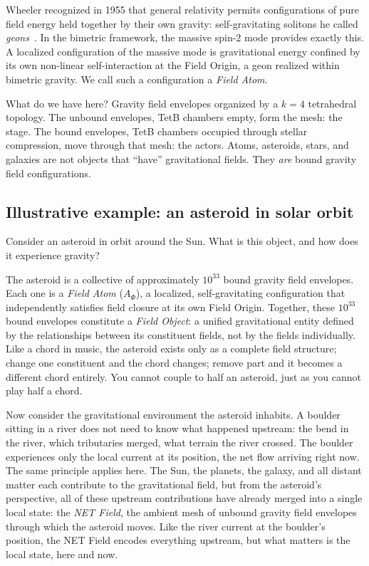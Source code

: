 \documentclass[aps,prd,preprint,superscriptaddress,showpacs,preprintnumbers,amsmath,amssymb,nofootinbib]{revtex4-2}
\begin{document}
Wheeler recognized in 1955 that general relativity permits configurations of pure field energy held together by their own gravity: self-gravitating solitons he called \emph{geons}~\cite{wheeler1955}. In the bimetric framework, the massive spin-2 mode provides exactly this. A localized configuration of the massive mode is gravitational energy confined by its own non-linear self-interaction at the Field Origin, a geon realized within bimetric gravity. We call such a configuration a \emph{Field Atom}.

What do we have here? Gravity field envelopes organized by a $k = 4$ tetrahedral topology. The unbound envelopes, TetB chambers empty, form the mesh: the stage. The bound envelopes, TetB chambers occupied through stellar compression, move through that mesh: the actors. Atoms, asteroids, stars, and galaxies are not objects that ``have'' gravitational fields. They \emph{are} bound gravity field configurations.

\subsection{Illustrative example: an asteroid in solar orbit}
\label{subsec:asteroid}

Consider an asteroid in orbit around the Sun. What is this object, and how does it experience gravity?

The asteroid is a collective of approximately $10^{33}$ bound gravity field envelopes. Each one is a \emph{Field Atom} ($A_\Phi$), a localized, self-gravitating configuration that independently satisfies field closure at its own Field Origin. Together, these $10^{33}$ bound envelopes constitute a \emph{Field Object}: a unified gravitational entity defined by the relationships between its constituent fields, not by the fields individually. Like a chord in music, the asteroid exists only as a complete field structure; change one constituent and the chord changes; remove part and it becomes a different chord entirely. You cannot couple to half an asteroid, just as you cannot play half a chord.

Now consider the gravitational environment the asteroid inhabits. A boulder sitting in a river does not need to know what happened upstream: the bend in the river, which tributaries merged, what terrain the river crossed. The boulder experiences only the local current at its position, the net flow arriving right now. The same principle applies here. The Sun, the planets, the galaxy, and all distant matter each contribute to the gravitational field, but from the asteroid's perspective, all of these upstream contributions have already merged into a single local state: the \emph{NET Field}, the ambient mesh of unbound gravity field envelopes through which the asteroid moves. Like the river current at the boulder's position, the NET Field encodes everything upstream, but what matters is the local state, here and now.
\end{document}
